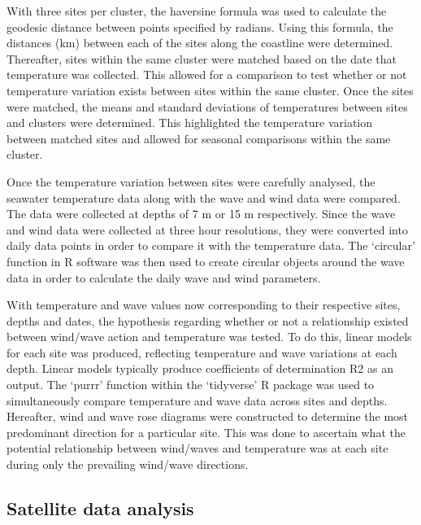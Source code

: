 \documentclass[12pt,A4paper,]{article}
\begin{document}
With three sites per cluster, the haversine formula was used to
calculate the geodesic distance between points specified by radians.
Using this formula, the distances (km) between each of the sites along
the coastline were determined. Thereafter, sites within the same cluster
were matched based on the date that temperature was collected. This
allowed for a comparison to test whether or not temperature variation
exists between sites within the same cluster. Once the sites were
matched, the means and standard deviations of temperatures between sites
and clusters were determined. This highlighted the temperature variation
between matched sites and allowed for seasonal comparisons within the
same cluster.

Once the temperature variation between sites were carefully analysed,
the seawater temperature data along with the wave and wind data were
compared. The data were collected at depths of 7 m or 15 m respectively.
Since the wave and wind data were collected at three hour resolutions,
they were converted into daily data points in order to compare it with
the temperature data. The `circular' function in R software was then
used to create circular objects around the wave data in order to
calculate the daily wave and wind parameters.

With temperature and wave values now corresponding to their respective
sites, depths and dates, the hypothesis regarding whether or not a
relationship existed between wind/wave action and temperature was
tested. To do this, linear models for each site was produced, reflecting
temperature and wave variations at each depth. Linear models typically
produce coefficients of determination R2 as an output. The `purrr'
function within the `tidyverse' R package was used to simultaneously
compare temperature and wave data across sites and depths. Hereafter,
wind and wave rose diagrams were constructed to determine the most
predominant direction for a particular site. This was done to ascertain
what the potential relationship between wind/waves and temperature was
at each site during only the prevailing wind/wave directions.

\subsection{Satellite data analysis}\label{satellite-data-analysis}
\end{document}
